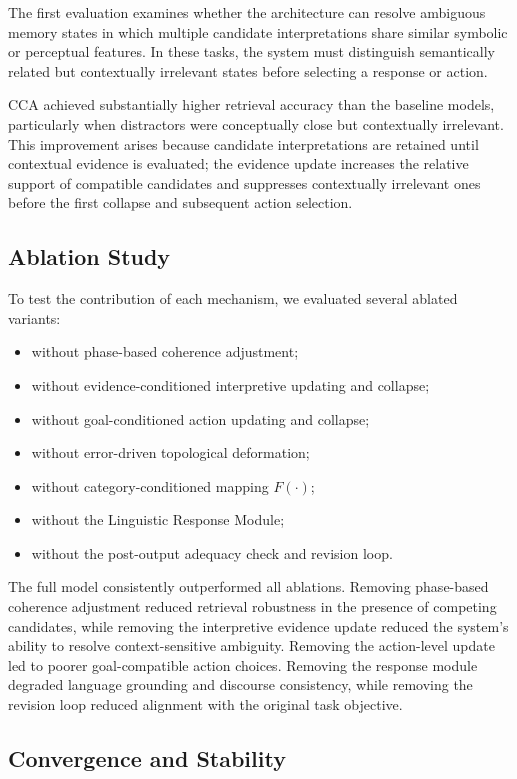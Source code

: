 \documentclass[10pt,journal,compsoc]{IEEEtran}
\begin{document}
The first evaluation examines whether the architecture can resolve ambiguous memory states in which multiple candidate interpretations share similar symbolic or perceptual features. In these tasks, the system must distinguish semantically related but contextually irrelevant states before selecting a response or action.

CCA achieved substantially higher retrieval accuracy than the baseline models, particularly when distractors were conceptually close but contextually irrelevant. This improvement arises because candidate interpretations are retained until contextual evidence is evaluated; the evidence update increases the relative support of compatible candidates and suppresses contextually irrelevant ones before the first collapse and subsequent action selection.

\subsection{Ablation Study}

To test the contribution of each mechanism, we evaluated several ablated variants:
\begin{itemize}
    \item without phase-based coherence adjustment;
    \item without evidence-conditioned interpretive updating and collapse;
    \item without goal-conditioned action updating and collapse;
    \item without error-driven topological deformation;
    \item without category-conditioned mapping $F(\cdot)$;
    \item without the Linguistic Response Module;
    \item without the post-output adequacy check and revision loop.
\end{itemize}

The full model consistently outperformed all ablations. Removing phase-based coherence adjustment reduced retrieval robustness in the presence of competing candidates, while removing the interpretive evidence update reduced the system's ability to resolve context-sensitive ambiguity. Removing the action-level update led to poorer goal-compatible action choices. Removing the response module degraded language grounding and discourse consistency, while removing the revision loop reduced alignment with the original task objective.

\subsection{Convergence and Stability}
\end{document}
